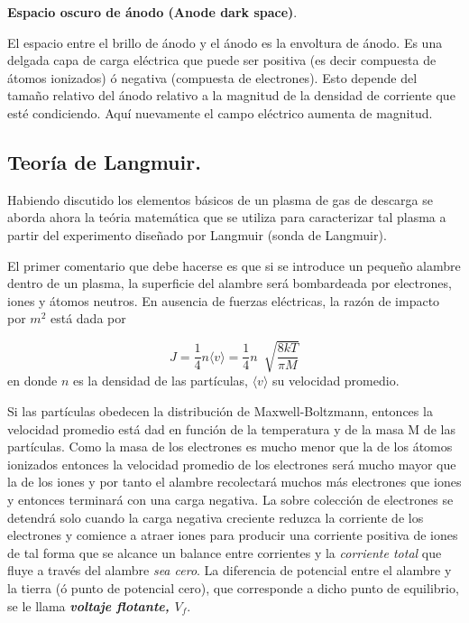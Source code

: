 \documentclass[letterpaper,12pt]{article}
\begin{document}
\textbf{Espacio oscuro de ánodo (Anode dark space)}.

El espacio entre el brillo de ánodo y el ánodo es la envoltura de ánodo. Es una delgada capa de carga eléctrica que puede ser positiva (es decir compuesta de átomos ionizados) ó negativa (compuesta de electrones). Esto depende del tamaño relativo del ánodo relativo a la magnitud de la densidad de corriente que esté condiciendo. Aquí nuevamente el campo eléctrico aumenta de magnitud.

\subsection*{Teoría de Langmuir.}

Habiendo discutido los elementos básicos de un plasma de gas de descarga se aborda ahora la teória matemática que se utiliza para caracterizar tal plasma a partir del experimento diseñado por Langmuir (sonda de Langmuir).

El primer comentario que debe hacerse es que si se introduce un pequeño alambre dentro de un plasma, la superficie del alambre será bombardeada por electrones, iones y átomos neutros. En ausencia de fuerzas eléctricas, la razón de impacto por $m^2$ está dada por

\begin{equation}\label{J1}
J=\frac{1}{4}n \langle  v \rangle=\frac{1}{4}n \ \sqrt[]{\frac{8kT}{\pi M}} 
\end{equation}
 en donde $n$ es la densidad de las partículas, $\langle v \rangle$ su velocidad promedio.
 
 Si las partículas obedecen la distribución de Maxwell-Boltzmann, entonces la velocidad promedio está dad en función de la temperatura y de la masa M de las partículas. Como la masa de los electrones es mucho menor que la de los átomos ionizados entonces la velocidad promedio de los electrones será mucho mayor que la de los iones y por tanto el alambre recolectará muchos más electrones que iones y entonces terminará con una carga negativa. La sobre colección de electrones se detendrá solo cuando la carga negativa creciente reduzca la corriente de los electrones y comience a atraer iones para producir una corriente positiva de iones de tal forma que se alcance un balance entre corrientes y la \textit{corriente total} que fluye a través del alambre \textit{sea cero}. La diferencia de potencial entre el alambre y la tierra (ó punto de potencial cero), que corresponde a dicho punto de equilibrio, se le llama \textbf{\textit{voltaje flotante, $V_f $}}. 
 
\end{document}
